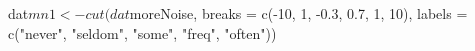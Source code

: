 \begin{Schunk}
\begin{Sinput}
  dat$mn1 <- cut(dat$moreNoise, breaks = c(-10, 1, -0.3, 0.7, 1, 10),
  labels = c("never", "seldom", "some", "freq", "often"))
\end{Sinput}
\end{Schunk}
